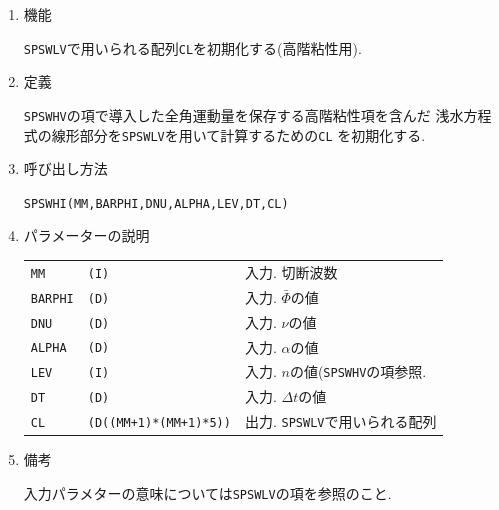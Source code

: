 \documentclass[a4j,fleqn]{jarticle}
\begin{document}
\begin{enumerate}

\item 機能

 {\tt SPSWLV}で用いられる配列{\tt CL}を初期化する(高階粘性用).

\item 定義

{\tt SPSWHV}の項で導入した全角運動量を保存する高階粘性項を含んだ
浅水方程式の線形部分を{\tt SPSWLV}を用いて計算するための{\tt CL}
を初期化する.

\item 呼び出し方法 

{\tt SPSWHI(MM,BARPHI,DNU,ALPHA,LEV,DT,CL)}

\item パラメーターの説明

\begin{tabular}{lll}
{\tt MM} & {\tt (I)} & 入力. 切断波数\\
{\tt BARPHI} & {\tt (D)} 
& 入力. $\bar\Phi$の値\\
{\tt DNU} & {\tt (D)} 
& 入力. $\nu$の値\\
{\tt ALPHA} & {\tt (D)} 
& 入力. $\alpha$の値\\
{\tt LEV} & {\tt (I)}
& 入力. $n$の値({\tt SPSWHV}の項参照.\\
{\tt DT} & {\tt (D)} 
& 入力. $\Delta t$の値\\
{\tt CL}  & {\tt (D((MM+1)*(MM+1)*5))}
             & 出力. {\tt SPSWLV}で用いられる配列
\end{tabular}

\item 備考

入力パラメターの意味については{\tt SPSWLV}の項を参照のこと.

\end{enumerate}
\end{document}

